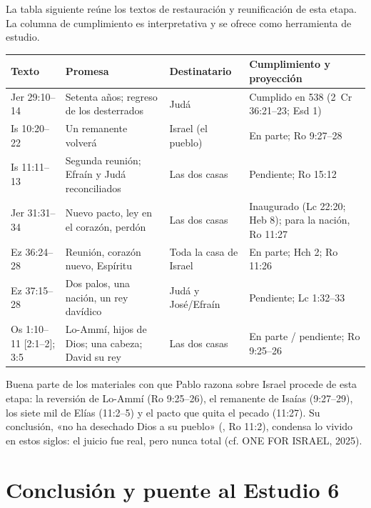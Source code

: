 La tabla siguiente reúne los textos de restauración y reunificación de esta etapa. La columna de cumplimiento es interpretativa y se ofrece como herramienta de estudio.

\begin{table}[!htbp]\centering\footnotesize
\renewcommand{\arraystretch}{1.12}
\begin{tabular}{>{\RaggedRight\arraybackslash}p{2.5cm}>{\RaggedRight\arraybackslash}p{4.6cm}>{\RaggedRight\arraybackslash}p{2.2cm}>{\RaggedRight\arraybackslash}p{4.8cm}}
\toprule
\textbf{Texto} & \textbf{Promesa} & \textbf{Destinatario} & \textbf{Cumplimiento y proyección}\\
\midrule
Jer 29:10--14 & Setenta años; regreso de los desterrados & Judá & Cumplido en 538 (2~Cr 36:21--23; Esd 1)\\
Is 10:20--22 & Un remanente volverá & Israel (el pueblo) & En parte; Ro 9:27--28\\
Is 11:11--13 & Segunda reunión; Efraín y Judá reconciliados & Las dos casas & Pendiente; Ro 15:12\\
Jer 31:31--34 & Nuevo pacto, ley en el corazón, perdón & Las dos casas & Inaugurado (Lc 22:20; Heb 8); para la nación, Ro 11:27\\
Ez 36:24--28 & Reunión, corazón nuevo, Espíritu & Toda la casa de Israel & En parte; Hch 2; Ro 11:26\\
Ez 37:15--28 & Dos palos, una nación, un rey davídico & Judá y José/Efraín & Pendiente; Lc 1:32--33\\
Os 1:10--11 [2:1--2]; 3:5 & Lo-Ammí, hijos de Dios; una cabeza; David su rey & Las dos casas & En parte / pendiente; Ro 9:25--26\\
\bottomrule
\end{tabular}\end{table}

Buena parte de los materiales con que Pablo razona sobre Israel procede de esta etapa: la reversión de Lo-Ammí (Ro 9:25--26), el remanente de Isaías (9:27--29), los siete mil de Elías (11:2--5) y el pacto que quita el pecado (11:27). Su conclusión, «no ha desechado Dios a su pueblo» (, Ro 11:2), condensa lo vivido en estos siglos: el juicio fue real, pero nunca total (cf. ONE FOR ISRAEL, 2025).

\section{Conclusión y puente al Estudio 6}

